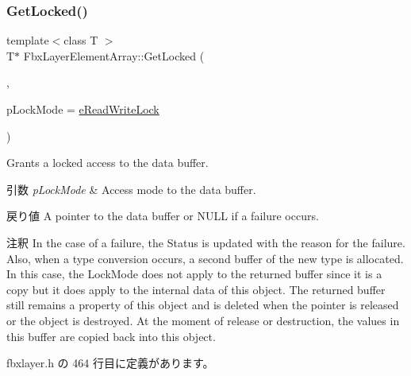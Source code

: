 \subsubsection{\texorpdfstring{Get\+Locked()}{GetLocked()}\hspace{0.1cm}{\footnotesize\ttfamily [3/3]}}
{\footnotesize\ttfamily template$<$class T $>$ \\
T$\ast$ Fbx\+Layer\+Element\+Array\+::\+Get\+Locked (\begin{DoxyParamCaption}\item[{T $\ast$}]{,  }\item[{\hyperlink{class_fbx_layer_element_array_a8968b1fb337f924d0e9ca87302b54d70}{E\+Lock\+Mode}}]{p\+Lock\+Mode = {\ttfamily \hyperlink{class_fbx_layer_element_array_a8968b1fb337f924d0e9ca87302b54d70afb510a1a3f85e5a4294bd956f5f936f9}{e\+Read\+Write\+Lock}} }\end{DoxyParamCaption})\hspace{0.3cm}{\ttfamily [inline]}}

Grants a locked access to the data buffer. 
\begin{DoxyParams}{引数}
{\em p\+Lock\+Mode} & Access mode to the data buffer. \\
\hline
\end{DoxyParams}
\begin{DoxyReturn}{戻り値}
A pointer to the data buffer or N\+U\+LL if a failure occurs. 
\end{DoxyReturn}
\begin{DoxyRemark}{注釈}
In the case of a failure, the Status is updated with the reason for the failure. Also, when a type conversion occurs, a second buffer of the new type is allocated. In this case, the Lock\+Mode does not apply to the returned buffer since it is a copy but it does apply to the internal data of this object. The returned buffer still remains a property of this object and is deleted when the pointer is released or the object is destroyed. At the moment of release or destruction, the values in this buffer are copied back into this object. 
\end{DoxyRemark}


 fbxlayer.\+h の 464 行目に定義があります。

\mbox{\label{class_fbx_layer_element_array_a2d832cc56fee7d1c1254e88e689f1eda}} 
